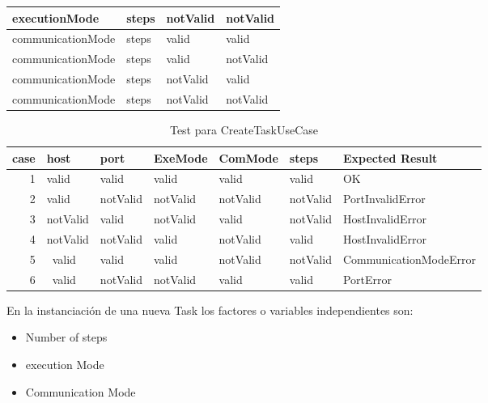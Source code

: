 \begin{table}[H]
\begin{tabular}{llll}
        \hline
        executionMode     & steps             & notValid        & notValid        \\
        \hline
        communicationMode & steps             & valid           & valid           \\
        \hline
        communicationMode & steps             & valid           & notValid        \\
        \hline
        communicationMode & steps             & notValid        & valid           \\
        \hline
        communicationMode & steps             & notValid        & notValid        \\
        \hline
    \end{tabular}
\end{table}

\begin{table}[H]
    \caption{Test para CreateTaskUseCase}\label{tab:createTaskPairWiseTest}
    \small
    \begin{tabular}{rllllll}
        case & host     & port     & ExeMode  & ComMode  & steps    & Expected Result        \\
        \hline
        1    & valid    & valid    & valid    & valid    & valid    & OK                     \\
        \hline
        2    & valid    & notValid & notValid & notValid & notValid & PortInvalidError       \\
        \hline
        3    & notValid & valid    & notValid & valid    & notValid & HostInvalidError       \\
        \hline
        4    & notValid & notValid & valid    & notValid & valid    & HostInvalidError       \\
        \hline
        5    & ~valid   & valid    & valid    & notValid & notValid & CommunicationModeError \\
        \hline
        6    & ~valid   & notValid & notValid & valid    & valid    & PortError              \\
        \hline
    \end{tabular}
\end{table}

En la instanciación de una nueva Task los factores o variables independientes son:

\begin{itemize}
    \item Number of steps
    \item execution Mode
    \item Communication Mode
\end{itemize}

